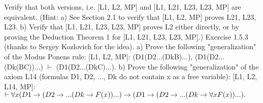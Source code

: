 Verify that both versions, i.e. [L1, L2, MP] and [L1, L21, L23, L23, MP] are equivalent. (Hint: a) See
Section 2.1 to verify that [L1, L2, MP] proves L21, L23, L23. b) Verify that [L1, L21, L23, L23, MP] proves
L2 either directly, or by proving the Deduction Theorem 1 for [L1, L21, L23, L23, MP].)
Exercise 1.5.3 (thanks to Sergey Kozlovich for the idea).
a) Prove the following "generalization" of the Modus Ponens rule:
[L1, L2, MP]: (D1\IMPLIES (D2\IMPLIES ...(Dk\IMPLIES B)...), (D1\IMPLIES (D2\IMPLIES ...(Dk\IMPLIES (B\IMPLIES C))...) \(\vdash\) (D1\IMPLIES (D2\IMPLIES ...(Dk\IMPLIES C)...).
b) Prove the following "generalization" of the axiom L14 (formulas D1, D2, ..., Dk do not contain x as a
free variable):
[L1, L2, L14, MP]: \(\vdash \forall x(D1\rightarrow (D2\rightarrow ...(Dk\rightarrow F(x))...) \rightarrow  (D1\rightarrow (D2\rightarrow ...(Dk\rightarrow \forall xF(x))...).\)

